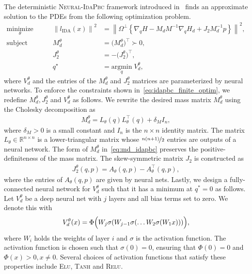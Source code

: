 The deterministic \textsc{Neural-IdaPbc} framework introduced
in~\cite{sirichotiyakul2022data} finds an approximate solution to the PDEs from the
following optimization problem.
\begin{equation}
  \begin{aligned}
      \underset{\theta }{\textrm{minimize}} 
      &&\quad \left\| l_{\textrm{IDA}} (x) \right\|^2 &= \left\| \Omega^\perp \left\{ \nabla_qH - M_dM^{-1} \nabla_qH_d + J_2M_d^{-1}p \right\} \right\|^2, \\
      \textrm{subject to}
      &&\quad M_d^\theta &= \big( M_d^\theta \big)^\top \succ 0, \\
      &&\quad J_2^\theta &= -\big( J_2^\theta \big)^\top, \\
      &&\quad q^\star &= \underset{q}{\textrm{argmin}}\; V_d^\theta,
  \end{aligned}    
  \label{eq:idapbc_finite_optim}%
\end{equation}
where $V^\theta_d$ and the entries of the $M^\theta_d$ and $J^\theta_2$ matrices
are parameterized by neural networks. 
%
To enforce the constraints shown in~\eqref{eq:idapbc_finite_optim}, we redefine
$M^\theta_d, J^\theta_2$ and $V^\theta_d$ as follows.
%
We rewrite the desired mass matrix $M^\theta_d$ using the Cholesky decomposition as
\begin{align}
  M^\theta_d = L_{\theta}(q)L_{\theta}^\top(q) + \delta_M I_n,
  \label{eq:md_idapbc}
\end{align}
\noindent where $\delta_M > 0$ is a small constant and $I_n$ is the $n \times n$
identity matrix.
%
The matrix $L_{\theta} \in \mathbb{R}^{n \times n}$ is a lower-triangular matrix
whose $\nicefrac{n(n+1)}{2}$ entries are outputs of a neural network. 
%
The form of $M_d^\theta$ in~\eqref{eq:md_idapbc} preserves the
positive-definiteness of the mass matrix.
%
The skew-symmetric matrix $J_2$ is constructed as 
\begin{align*}
  J_2^\theta(q, p) = A_\theta(q, p) - A^\top_\theta(q, p),
\end{align*}
\noindent where the entries of $A_{\theta}(q, p)$ are given by neural nets.
%
Lastly, we design a fully-connected neural network for $V^\theta_d$ such that it
has a minimum at $q^*=0$ as follows.
%
Let $V^\theta_d$ be a deep neural net with $j$ layers and all bias terms set to
zero. We denote this with
\begin{equation}
  V_d^\theta(x) = \Phi \Bigl( W_j\sigma(W_{j-1}\sigma(\ldots W_2\sigma(W_1x))) \Bigr),
  \label{eq:Vdnet_constraint}
\end{equation}
\noindent where $W_i$ holds the weights of layer $i$ and $\sigma$ is the activation function.
%
The activation function is chosen such that $\sigma(0) = 0$, ensuring that
$\Phi(0) = 0$ and $\Phi(x) > 0, x \ne 0$.
%
Several choices of activation functions that satisfy these properties include
\textsc{Elu}, \textsc{Tanh} and \textsc{Relu}.
%


